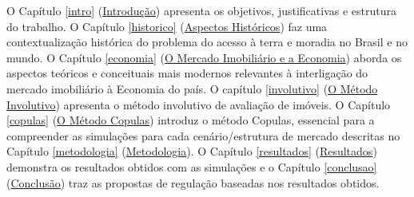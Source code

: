 \documentclass[
	12pt,				%
	oneside,			%
	a4paper,			%
	chapter=TITLE,		%
	section=TITLE,		%
	english,			%
	brazil				%
	]{abntex2}
\begin{document}
O Capítulo \ref{intro} (\protect\hyperlink{intro}{Introdução}) apresenta
os objetivos, justificativas e estrutura do trabalho. O Capítulo
\ref{historico} (\protect\hyperlink{historico}{Aspectos Históricos}) faz
uma contextualização histórica do problema do acesso à terra e moradia
no Brasil e no mundo. O Capítulo \ref{economia}
(\protect\hyperlink{economia}{O Mercado Imobiliário e a Economia})
aborda os aspectos teóricos e conceituais mais modernos relevantes à
interligação do mercado imobiliário à Economia do país. O capítulo
\ref{involutivo} (\protect\hyperlink{involutivo}{O Método Involutivo})
apresenta o método involutivo de avaliação de imóveis. O Capítulo
\ref{copulas} (\protect\hyperlink{copulas}{O Método Copulas}) introduz o
método Copulas, essencial para a compreender as simulações para cada
cenário/estrutura de mercado descritas no Capítulo \ref{metodologia}
(\protect\hyperlink{metodologia}{Metodologia}). O Capítulo
\ref{resultados} (\protect\hyperlink{resultados}{Resultados}) demonstra
os resultados obtidos com as simulações e o Capítulo \ref{conclusao}
(\protect\hyperlink{conclusao}{Conclusão}) traz as propostas de
regulação baseadas nos resultados obtidos.
\end{document}
